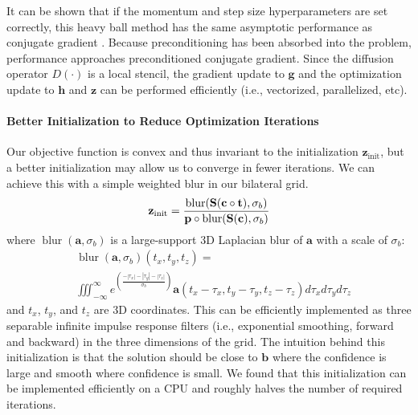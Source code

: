 It can be shown that if the momentum and step size hyperparameters are set correctly, this heavy ball method has the same asymptotic performance as conjugate gradient \cite{polyak1964some}.
Because preconditioning has been absorbed into the problem, performance approaches preconditioned conjugate gradient.
Since the diffusion operator $D(\cdot)$ is a local stencil, the gradient update to $\mathbf{g}$ and the optimization update to $\mathbf{h}$ and $\mathbf{z}$ can be performed efficiently (i.e., vectorized, parallelized, etc).

\paragraph{Better Initialization to Reduce Optimization Iterations}
Our objective function is convex and thus invariant to the initialization $\mathbf{z}_{\mathrm{init}}$, but a better initialization may allow us to converge in fewer iterations. We can achieve this with a simple weighted blur in our bilateral grid.
\begin{equation*}
\mathbf{z}_{\mathrm{init}} = { \operatorname{blur}( \mathbf{S}( \mathbf{c} \circ \mathbf{t}), \sigma_b) \over \mathbf{p} \circ \operatorname{blur}( \mathbf{S}(\mathbf{c}), \sigma_b ) }
\end{equation*}
where $\operatorname{blur}(\mathbf{a}, \sigma_b)$ is a large-support 3D Laplacian blur of $\mathbf{a}$ with a scale of $\sigma_b$:
\begin{equation*}
\begin{split}
  & \operatorname{blur}(\mathbf{a}, \sigma_b)(t_x, t_y, t_z) =  \\
  & \displaystyle \iiint_{-\infty }^{\infty } e^{ \left( \frac{-|\tau_x|-|\tau_y|-|\tau_z|}{\sigma_b} \right)}
      \mathbf{a}(t_x-\tau_x, t_y-\tau_y, t_z-\tau_z ) d \tau_x d \tau_y d \tau_z
\end{split}
\end{equation*}
and $t_x$, $t_y$, and $t_z$ are 3D coordinates.
This can be efficiently implemented as three separable infinite impulse response filters  (i.e., exponential smoothing, forward and backward) in the three dimensions of the grid.
The intuition
behind this initialization is that the solution should be close to $\mathbf{b}$
where the confidence is large and smooth where confidence is small.
We found that this initialization can be implemented efficiently on a CPU and
roughly halves the number of required iterations.

